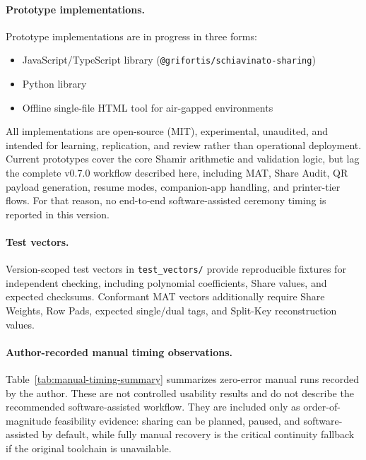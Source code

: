 \documentclass[11pt]{article}
\begin{document}
\paragraph{Prototype implementations.} Prototype implementations are in progress in three forms:
\begin{itemize}[noitemsep]
    \item JavaScript/TypeScript library (\texttt{@grifortis/schiavinato-sharing})
    \item Python library
    \item Offline single-file HTML tool for air-gapped environments
\end{itemize}
All implementations are open-source (MIT), experimental, unaudited, and intended for learning, replication, and review rather than operational deployment. Current prototypes cover the core Shamir arithmetic and validation logic, but lag the complete v0.7.0 workflow described here, including MAT, Share Audit, QR payload generation, resume modes, companion-app handling, and printer-tier flows. For that reason, no end-to-end software-assisted ceremony timing is reported in this version.

\paragraph{Test vectors.} Version-scoped test vectors in \texttt{test\_vectors/} provide reproducible fixtures for independent checking, including polynomial coefficients, Share values, and expected checksums. Conformant MAT vectors additionally require Share Weights, Row Pads, expected single/dual tags, and Split-Key reconstruction values.

\paragraph{Author-recorded manual timing observations.} Table~\ref{tab:manual-timing-summary} summarizes zero-error manual runs recorded by the author. These are not controlled usability results and do not describe the recommended software-assisted workflow. They are included only as order-of-magnitude feasibility evidence: sharing can be planned, paused, and software-assisted by default, while fully manual recovery is the critical continuity fallback if the original toolchain is unavailable.
\end{document}
